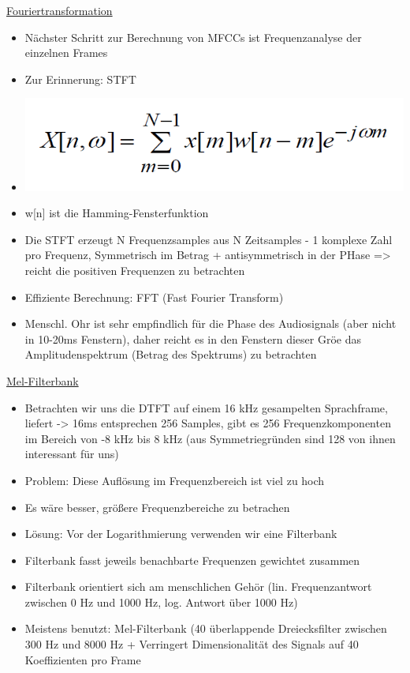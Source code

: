 \documentclass[a4paper,10pt,oneside]{article}
\begin{document}
\underline{Fouriertransformation} \\
	\begin{itemize}
		\item Nächster Schritt zur Berechnung von MFCCs ist Frequenzanalyse der einzelnen Frames
		\item Zur Erinnerung: STFT
		\item[] \includegraphics[scale=0.15]{Grafiken/1315.png}
		\item w[n] ist die Hamming-Fensterfunktion
		\item Die STFT erzeugt N Frequenzsamples aus N Zeitsamples - 1 komplexe Zahl pro Frequenz, Symmetrisch im Betrag + antisymmetrisch in der PHase => reicht die positiven Frequenzen zu betrachten
		\item Effiziente Berechnung: FFT (Fast Fourier Transform)
		\item Menschl. Ohr ist sehr empfindlich für die Phase des Audiosignals (aber nicht in 10-20ms Fenstern), daher reicht es in den Fenstern dieser Gröe das Amplitudenspektrum (Betrag des Spektrums) zu betrachten
	\end{itemize}
	
\underline{Mel-Filterbank} \\
	\begin{itemize}
		\item Betrachten wir uns die DTFT auf einem 16 kHz gesampelten Sprachframe, liefert -> 16ms entsprechen 256 Samples, gibt es 256 Frequenzkomponenten im Bereich von -8 kHz bis 8 kHz (aus Symmetriegründen sind 128 von ihnen interessant für uns)
		\item Problem: Diese Auflösung im Frequenzbereich ist viel zu hoch
		\item Es wäre besser, größere Frequenzbereiche zu betrachen
		\item Lösung: Vor der Logarithmierung verwenden wir eine Filterbank
		\item Filterbank fasst jeweils benachbarte Frequenzen gewichtet zusammen
		\item Filterbank orientiert sich am menschlichen Gehör (lin. Frequenzantwort zwischen 0 Hz und 1000 Hz, log. Antwort über 1000 Hz)
		\item Meistens benutzt: Mel-Filterbank (40 überlappende Dreiecksfilter zwischen 300 Hz und 8000 Hz + Verringert Dimensionalität des Signals auf 40 Koeffizienten pro Frame
	\end{itemize}
	
\end{document}
